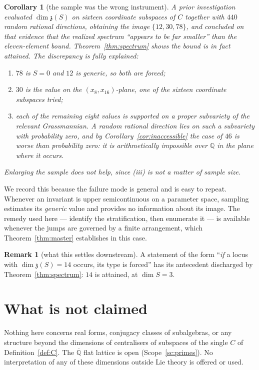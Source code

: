 \documentclass[11pt,a4paper]{article}
\newtheorem{corollary}[theorem]{Corollary}
\theoremstyle{definition}
\newtheorem{remark}[theorem]{Remark}
\theoremstyle{remark}
\newcommand{\z}{\mathfrak{z}}
\newcommand{\Q}{\mathbb{Q}}
\begin{document}
\begin{corollary}[the sample was the wrong instrument]\label{cor:sampling}
A prior investigation evaluated $\dim\z(S)$ on sixteen coordinate subspaces of $C$ together with
$440$ random rational directions, obtaining the image $\{12,30,78\}$, and concluded on that
evidence that the realized spectrum ``appears to be far smaller'' than the eleven-element bound.
Theorem~\ref{thm:spectrum} shows the bound is in fact attained. The discrepancy is fully
explained:
\begin{enumerate}[label=\textup{(\roman*)},leftmargin=2.4em]
\item $78$ is $S=0$ and $12$ is generic, so both are forced;
\item $30$ is the value on the $(x_8,x_{16})$-plane, one of the sixteen coordinate subspaces
      tried;
\item each of the remaining eight values is supported on a proper subvariety of the relevant
      Grassmannian. A random rational direction lies on such a subvariety with probability zero,
      and by Corollary~\ref{cor:inaccessible} the case of $46$ is worse than probability zero:
      it is arithmetically impossible over $\Q$ in the plane where it occurs.
\end{enumerate}
Enlarging the sample does not help, since (iii) is not a matter of sample size.
\end{corollary}

We record this because the failure mode is general and is easy to repeat. Whenever an invariant
is upper semicontinuous on a parameter space, sampling estimates its \emph{generic} value and
provides no information about its image. The remedy used here --- identify the stratification,
then enumerate it --- is available whenever the jumps are governed by a finite arrangement, which
Theorem~\ref{thm:master} establishes in this case.

\begin{remark}[what this settles downstream]
A statement of the form ``\emph{if} a locus with $\dim\z(S)=14$ occurs, its type is forced''
has its antecedent discharged by Theorem~\ref{thm:spectrum}: $14$ is attained, at
$\dim S=3$.
\end{remark}

\section{What is not claimed}

Nothing here concerns real forms, conjugacy classes of subalgebras, or any structure beyond the
dimensions of centralisers of subspaces of the single $C$ of Definition~\ref{def:C}. The
$\overline{\Q}$ flat lattice is open (Scope~\ref{sc:primes}). No interpretation of any of these
dimensions outside Lie theory is offered or used.
\end{document}
